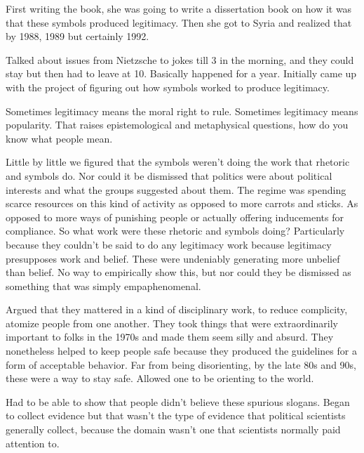 \documentclass{article}
\begin{document}
First writing the book, she was going to write a dissertation book on how it was that these symbols produced legitimacy.  Then she got to Syria and realized that by 1988, 1989 but certainly 1992.  

\vspace{5mm}

Talked about issues from Nietzsche to jokes till 3 in the morning, and they could stay but then had to leave at 10.  Basically happened for a year.  Initially came up with the project of figuring out how symbols worked to produce legitimacy.  

\vspace{5mm}

Sometimes legitimacy means the moral right to rule.  Sometimes legitimacy means popularity.  That raises epistemological and metaphysical questions, how do you know what people mean.  

\vspace{5mm}

Little by little we figured that the symbols weren't doing the work that rhetoric and symbols do.  Nor could it be dismissed that politics were about political interests and what the groups suggested about them.  The regime was spending scarce resources on this kind of activity as opposed to more carrots and sticks.  As opposed to more ways of punishing people or actually offering inducements for compliance.  So what work were these rhetoric and symbols doing?  Particularly because they couldn't be said to do any legitimacy work because legitimacy presupposes work and belief.  These were undeniably generating more unbelief than belief.  No way to empirically show this, but nor could they be dismissed as something that was simply empaphenomenal.  

\vspace{5mm}

Argued that they mattered in a kind of disciplinary work, to reduce complicity, atomize people from one another.  They took things that were extraordinarily important to folks in the 1970s and made them seem silly and absurd.  They nonetheless helped to keep people safe because they produced the guidelines for a form of acceptable behavior.  Far from being disorienting, by the late 80s and 90s, these were a way to stay safe.  Allowed one to be orienting to the world.  

\vspace{5mm}

Had to be able to show that people didn't believe these spurious slogans.  Began to collect evidence but that wasn't the type of evidence that political scientists generally collect, because the domain wasn't one that scientists normally paid attention to.  
\end{document}
